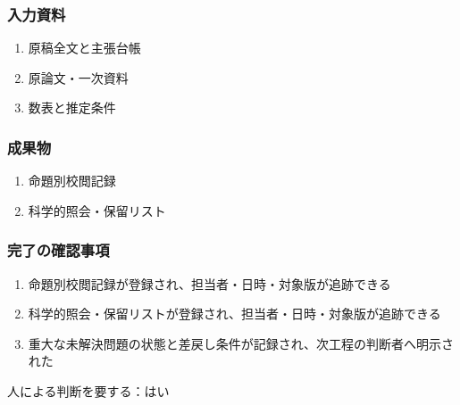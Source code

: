\documentclass[a4paper,11pt]{article}
\begin{document}
\subsubsection*{入力資料}
\begin{enumerate}[leftmargin=2em,itemsep=0.35em]
\item 原稿全文と主張台帳
\item 原論文・一次資料
\item 数表と推定条件
\end{enumerate}
\subsubsection*{成果物}
\begin{enumerate}[leftmargin=2em,itemsep=0.35em]
\item 命題別校閲記録
\item 科学的照会・保留リスト
\end{enumerate}
\subsubsection*{完了の確認事項}
\begin{enumerate}[leftmargin=2em,itemsep=0.35em]
\item 命題別校閲記録が登録され、担当者・日時・対象版が追跡できる
\item 科学的照会・保留リストが登録され、担当者・日時・対象版が追跡できる
\item 重大な未解決問題の状態と差戻し条件が記録され、次工程の判断者へ明示された
\end{enumerate}
\par 人による判断を要する：はい\par\medskip
\end{document}
